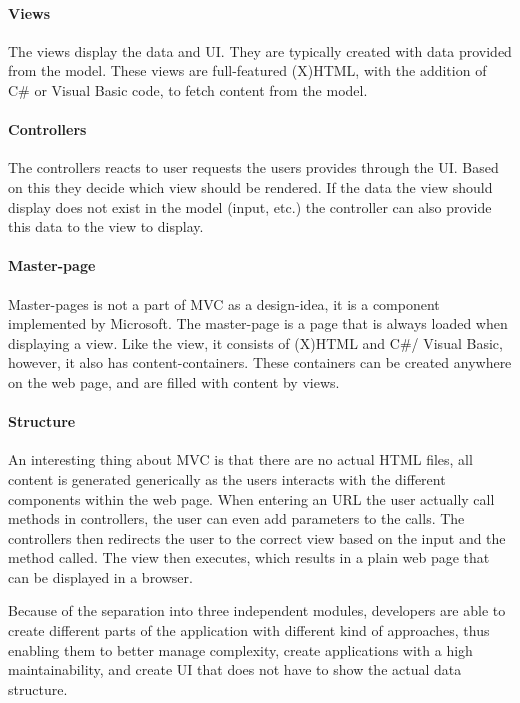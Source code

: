 \paragraph{Views}
The views display the data and UI. They are typically created with data provided from the model. These views are full-featured (X)HTML, with the addition of C\# or Visual Basic code, to fetch content from the model.

\paragraph{Controllers}
The controllers reacts to user requests the users provides through the UI. Based on this they decide which view should be rendered. If the data the view should display does not exist in the model (input, etc.) the controller can also provide this data to the view to display.

\paragraph{Master-page}
Master-pages is not a part of MVC as a design-idea, it is a component implemented by Microsoft. The master-page is a page that is always loaded when displaying a view. Like the view, it consists of (X)HTML and C\#/ Visual Basic, however, it also has content-containers. These containers can be created anywhere on the web page, and are filled with content by views.

\paragraph{Structure}
An interesting thing about MVC is that there are no actual HTML files, all content is generated generically as the users interacts with the different components within the web page. When entering an URL the user actually call methods in controllers, the user can even add parameters to the calls. The controllers then redirects the user to the correct view based on the input and the method called. The view then executes, which results in a plain web page that can be displayed in a browser.

Because of the separation into three independent modules, developers are able to create different parts of the application with different kind of approaches, thus enabling them to better manage complexity, create applications with a high maintainability, and create UI that does not have to show the actual data structure.


